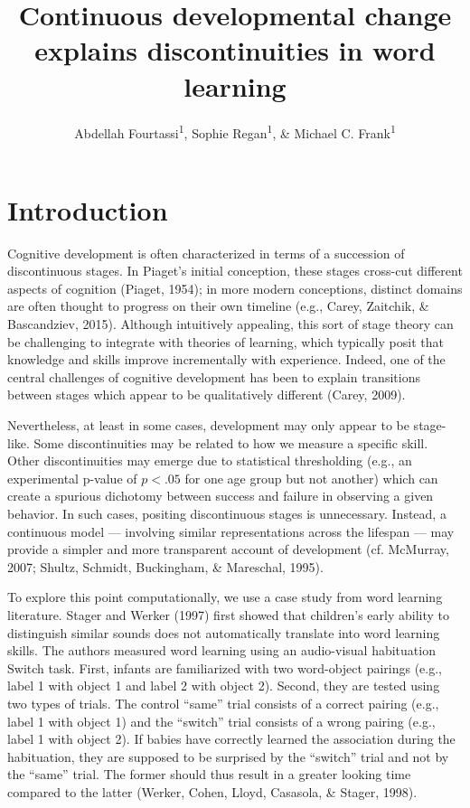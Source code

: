 \documentclass[english,,man,floatsintext]{apa6}
\title{Continuous developmental change explains discontinuities in word
learning}
\author{Abdellah Fourtassi\textsuperscript{1}, Sophie Regan\textsuperscript{1},
\& Michael C. Frank\textsuperscript{1}}
\date{}
\affiliation{
\vspace{0.5cm}
\textsuperscript{1} Department of Psychology, Stanford University}
\theoremstyle{definition}
\theoremstyle{definition}
\theoremstyle{definition}
\theoremstyle{remark}
\begin{document}
\maketitle

\section{Introduction}\label{introduction}

Cognitive development is often characterized in terms of a succession of
discontinuous stages. In Piaget's initial conception, these stages
cross-cut different aspects of cognition (Piaget, 1954); in more modern
conceptions, distinct domains are often thought to progress on their own
timeline (e.g., Carey, Zaitchik, \& Bascandziev, 2015). Although
intuitively appealing, this sort of stage theory can be challenging to
integrate with theories of learning, which typically posit that
knowledge and skills improve incrementally with experience. Indeed, one
of the central challenges of cognitive development has been to explain
transitions between stages which appear to be qualitatively different
(Carey, 2009).

Nevertheless, at least in some cases, development may only appear to be
stage-like. Some discontinuities may be related to how we measure a
specific skill. Other discontinuities may emerge due to statistical
thresholding (e.g., an experimental p-value of \(p < .05\) for one age
group but not another) which can create a spurious dichotomy between
success and failure in observing a given behavior. In such cases,
positing discontinuous stages is unnecessary. Instead, a continuous
model --- involving similar representations across the lifespan --- may
provide a simpler and more transparent account of development (cf.
McMurray, 2007; Shultz, Schmidt, Buckingham, \& Mareschal, 1995).

To explore this point computationally, we use a case study from word
learning literature. Stager and Werker (1997) first showed that
children's early ability to distinguish similar sounds does not
automatically translate into word learning skills. The authors measured
word learning using an audio-visual habituation Switch task. First,
infants are familiarized with two word-object pairings (e.g., label 1
with object 1 and label 2 with object 2). Second, they are tested using
two types of trials. The control \enquote{same} trial consists of a
correct pairing (e.g., label 1 with object 1) and the \enquote{switch}
trial consists of a wrong pairing (e.g., label 1 with object 2). If
babies have correctly learned the association during the habituation,
they are supposed to be surprised by the \enquote{switch} trial and not
by the \enquote{same} trial. The former should thus result in a greater
looking time compared to the latter (Werker, Cohen, Lloyd, Casasola, \&
Stager, 1998).
\end{document}
